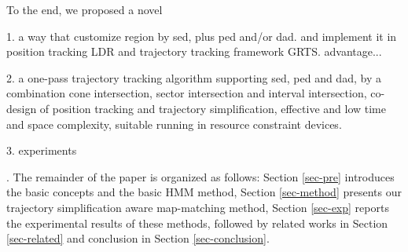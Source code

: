 To the end, we proposed a novel 

1. a way that customize region by sed, plus ped and/or dad. and implement it in position tracking LDR and trajectory tracking framework GRTS. advantage...

2. a one-pass trajectory tracking algorithm supporting sed, ped and dad, by a combination cone intersection, sector intersection and interval intersection, \ie co-design of position tracking and trajectory simplification, effective and low time and space complexity, suitable running in resource constraint devices.

3. experiments

.
The remainder of the paper is organized as follows:
Section \ref{sec-pre} introduces the basic concepts and the basic HMM method,
Section \ref{sec-method} presents our trajectory simplification aware map-matching method,
Section \ref{sec-exp} reports the experimental results of these methods, followed by related works in Section \ref{sec-related} and conclusion in Section \ref{sec-conclusion}.



